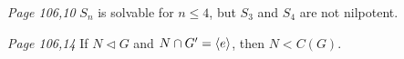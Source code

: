 \begin{enumerate}
\newpage
\prob\textit{Page 106,10} 
$S_n$ is solvable for $n\leq 4$, but $S_3$ and $S_4$ are not nilpotent.
\soln
\vspace{6cm}


\prob\textit{Page 106,14} 
If $N\lhd G$ and $N\cap G^\prime = \langle e\rangle$, then $N< C(G)$.
\soln
\vspace{3cm}


\end{enumerate}
